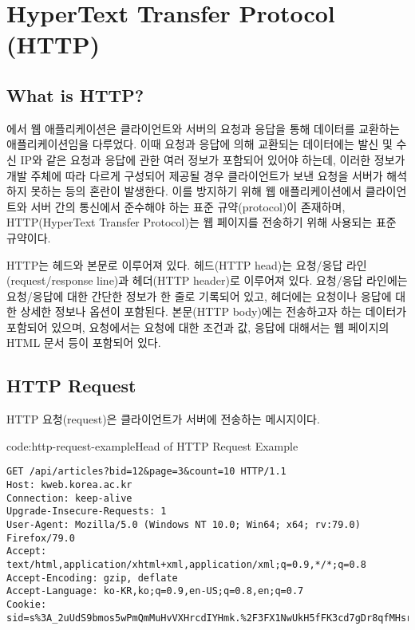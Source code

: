 \section{HyperText Transfer Protocol (HTTP)}\label{sect:hypertext-transfer-protocol}

\subsection*{What is HTTP?}

에서 웹 애플리케이션은 클라이언트와 서버의 요청과 응답을 통해 데이터를 교환하는 애플리케이션임을 다루었다. 이때 요청과 응답에 의해 교환되는 데이터에는 발신 및 수신 IP와 같은 요청과 응답에 관한 여러 정보가 포함되어 있어야 하는데, 이러한 정보가 개발 주체에 따라 다르게 구성되어 제공될 경우 클라이언트가 보낸 요청을 서버가 해석하지 못하는 등의 혼란이 발생한다. 이를 방지하기 위해 웹 애플리케이션에서 클라이언트와 서버 간의 통신에서 준수해야 하는 표준 규약(protocol)이 존재하며, HTTP(HyperText Transfer Protocol)는 웹 페이지를 전송하기 위해 사용되는 표준 규약이다.

HTTP는 헤드와 본문로 이루어져 있다. 헤드(HTTP head)는 요청/응답 라인(request/response line)과 헤더(HTTP header)로 이루어져 있다. 요청/응답 라인에는 요청/응답에 대한 간단한 정보가 한 줄로 기록되어 있고, 헤더에는 요청이나 응답에 대한 상세한 정보나 옵션이 포함된다. 본문(HTTP body)에는 전송하고자 하는 데이터가 포함되어 있으며, 요청에서는 요청에 대한 조건과 값, 응답에 대해서는 웹 페이지의 HTML 문서 등이 포함되어 있다.

\subsection*{HTTP Request}

HTTP 요청(request)은 클라이언트가 서버에 전송하는 메시지이다.

\begin{codeenv}{code:http-request-example}{Head of HTTP Request Example}\begin{verbatim}
GET /api/articles?bid=12&page=3&count=10 HTTP/1.1
Host: kweb.korea.ac.kr
Connection: keep-alive
Upgrade-Insecure-Requests: 1
User-Agent: Mozilla/5.0 (Windows NT 10.0; Win64; x64; rv:79.0) Firefox/79.0
Accept: text/html,application/xhtml+xml,application/xml;q=0.9,*/*;q=0.8
Accept-Encoding: gzip, deflate
Accept-Language: ko-KR,ko;q=0.9,en-US;q=0.8,en;q=0.7
Cookie: sid=s%3A_2uUdS9bmos5wPmQmMuHvVXHrcdIYHmk.%2F3FX1NwUkH5fFK3cd7gDr8qfMHsrvfMWGSO
\end{verbatim}
\end{codeenv}


